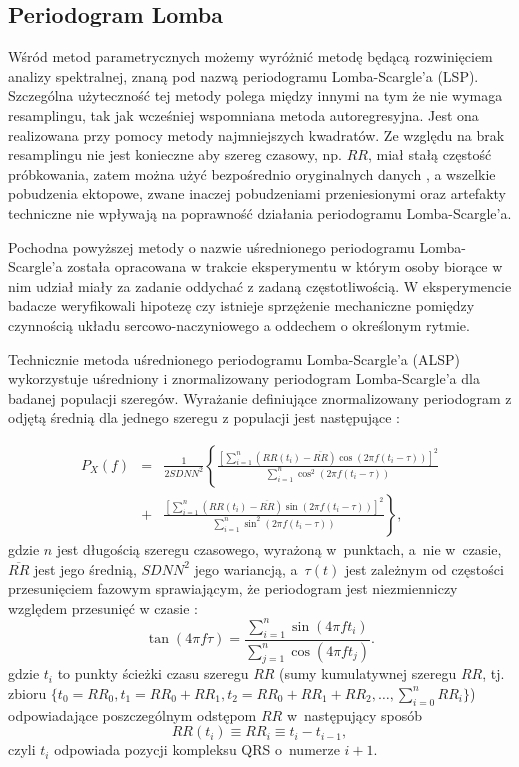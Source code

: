\subsection{Periodogram Lomba}

Wśród metod parametrycznych możemy wyróżnić metodę będącą rozwinięciem analizy spektralnej,
znaną pod nazwą periodogramu Lomba-Scargle'a (LSP). Szczególna użyteczność tej metody
polega między innymi na tym że nie wymaga resamplingu, tak jak wcześniej wspomniana 
metoda autoregresyjna. Jest ona realizowana przy pomocy metody najmniejszych kwadratów.
Ze względu na brak resamplingu nie jest konieczne aby szereg czasowy, np. $RR$, miał stałą
częstość próbkowania, zatem można użyć bezpośrednio oryginalnych danych \cite{scargle, lomb_o, c++, thong},
a wszelkie pobudzenia ektopowe, zwane inaczej pobudzeniami przeniesionymi oraz
artefakty techniczne nie wpływają na poprawność działania periodogramu Lomba-Scargle'a.

Pochodna powyższej metody o nazwie uśrednionego periodogramu Lomba-Scargle'a została
opracowana w trakcie eksperymentu w którym osoby biorące w nim udział miały za zadanie
oddychać z zadaną częstotliwością. W eksperymencie badacze weryfikowali
hipotezę czy istnieje sprzężenie mechaniczne pomiędzy czynnością układu sercowo-naczyniowego
a oddechem o określonym rytmie. 

Technicznie metoda uśrednionego periodogramu Lomba-Scargle'a (ALSP) wykorzystuje uśredniony i
znormalizowany periodogram Lomba-Scargle'a dla badanej populacji szeregów. Wyrażanie
definiujące znormalizowany periodogram z odjętą średnią dla jednego szeregu z populacji
jest następujące \cite{c++, thong, vanicek}:

\begin{eqnarray}
P_{X}(f)&=&\frac{1}{2SDNN^{2}}\left\{\frac{\left[ \sum_{i=1}^{n}(RR(t_{i})-\overline{RR})\cos(2\pi f(t_{i}-\tau))\right]^{2}}{\sum_{i=1}^{n}\cos^{2}(2\pi f(t_{i}-\tau))}\right. \label{LSPeriodogram}\nonumber\\ 
&+&\left. \frac{\left[ \sum_{i=1}^{n}(RR(t_{i})-\overline{RR})\sin(2\pi f(t_{i}-\tau))\right]^{2}}{\sum_{i=1}^{n}\sin^{2}(2\pi f(t_{i}-\tau))}\right\}
\label{eq:lomb} ,
\end{eqnarray}
gdzie $n$ jest długością szeregu czasowego, wyrażoną w~punktach, a~nie w~czasie,
$\overline{RR}$ jest jego średnią, $SDNN^{2}$ jego wariancją, a~$\tau(t)$ jest zależnym od
częstości przesunięciem fazowym sprawiającym, że periodogram jest niezmienniczy względem
przesunięć w czasie \cite{c++,thong,lomb,vanicek}:
\begin{equation}
\tan(4\pi f\tau)=\frac{\sum_{i=1}^{n}\sin(4\pi f t_{i})}{\sum_{j=1}^{n}\cos(4\pi f t_{j})}. \label{tau}
\end{equation}
gdzie $t_{i}$ to punkty ścieżki czasu szeregu $RR$ (sumy kumulatywnej szeregu $RR$, tj.
zbioru $\{t_0=RR_0, t_1=RR_0+RR_1, t_2=RR_0+RR_1+RR_2, \ldots, \sum_{i=0}^n RR_i \}$)
odpowiadające poszczególnym odstępom $RR$ w~następujący sposób
\begin{equation}
RR(t_{i})\equiv RR_{i}\equiv t_{i}-t_{i-1}, \label{RRy}
\end{equation}
czyli $t_{i}$ odpowiada pozycji kompleksu QRS o~numerze $i+1$.

